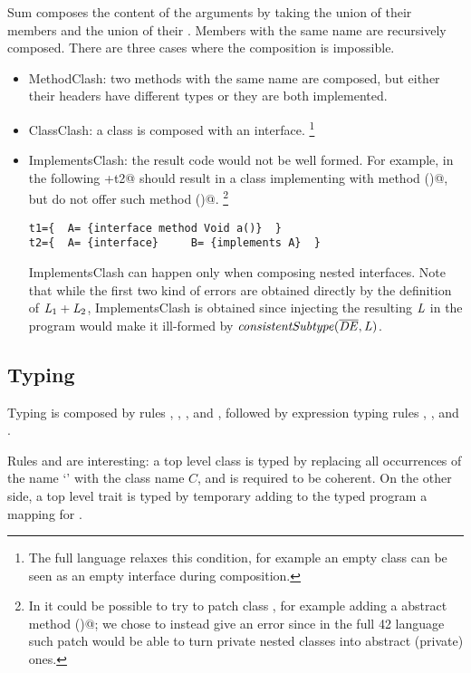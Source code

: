 Sum composes the content of the arguments
by taking the union of their members and the union of their \Q@implements@.
Members with the same name are recursively composed.
There are three cases where the composition is impossible.
\begin{itemize}
\item MethodClash: two methods with the same name are composed,
but either their headers have different types or they are both implemented.
\item ClassClash: a class is composed with an interface.%
\footnote{
The full language relaxes this condition, for example an empty class can be seen as an empty interface during composition.
}
\item ImplementsClash:
the result code would not be well formed.
For example, in the following
+t2@ should result in a class \Q@B@ implementing \Q@A@ with method \Q@a()@,
but \Q@B@ do not offer such method \Q@a()@.%
\footnote{In \name it could be possible to try to patch class \Q@B@, for example adding a
abstract method \Q@a()@;  we chose to instead give an error since in the full 42 language
such patch would 
be able to turn private nested classes
into abstract (private) ones.}

\saveSpace\saveSpace
\begin{lstlisting}
t1={  A= {interface method Void a()}  }
t2={  A= {interface}     B= {implements A}  }
\end{lstlisting}\saveSpace\saveSpace

ImplementsClash can happen only when composing nested interfaces. Note that while the first two kind of errors are obtained directly by the definition of 
$\mathit{L}_1+\mathit{L}_2$, ImplementsClash is obtained since injecting the resulting 
$\mathit{L}$ in the program would make it ill-formed by 
$\mathit{consistentSubtype}(\overline{\mathit{DE}},\mathit{L})$.
\end{itemize}
\saveSpace
\subsection{Typing}
\saveSpace
Typing is composed by rules , ,
,
 and ,
followed by expression typing rules
, ,  and .

Rules  and 
are interesting: a top level class is typed by replacing all occurrences of the name `\Q@This@' with the class name $C$,
and is required to be coherent.
On the other side, a top level trait is typed by temporary adding to the typed program a mapping for
\Q@This@.

